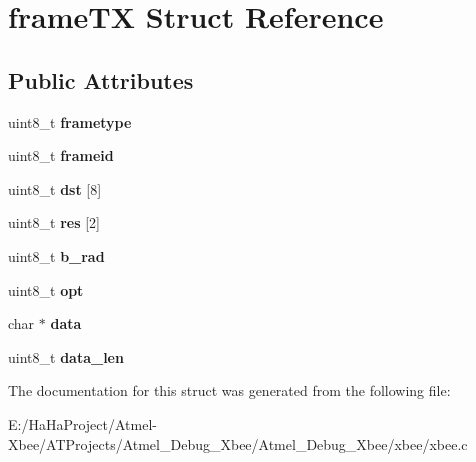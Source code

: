 \hypertarget{structframe_t_x}{}\section{frame\+TX Struct Reference}
\label{structframe_t_x}
\subsection*{Public Attributes}
\begin{DoxyCompactItemize}
\item 
\mbox{\label{structframe_t_x_ae0184264e132f9acfedd9d73e067d749}} 
uint8\+\_\+t {\bfseries frametype}
\item 
\mbox{\label{structframe_t_x_a81728989f69fb448c3107efe57d9acee}} 
uint8\+\_\+t {\bfseries frameid}
\item 
\mbox{\label{structframe_t_x_ac6af0f89587bfdd91eabbc1664ed0b18}} 
uint8\+\_\+t {\bfseries dst} \mbox{[}8\mbox{]}
\item 
\mbox{\label{structframe_t_x_aaa8e3f6c37ba7164586ece2aa05d02d1}} 
uint8\+\_\+t {\bfseries res} \mbox{[}2\mbox{]}
\item 
\mbox{\label{structframe_t_x_a9902ea07b8e5fc897038c4a78c052d46}} 
uint8\+\_\+t {\bfseries b\+\_\+rad}
\item 
\mbox{\label{structframe_t_x_a683e80dc13eeb1ab084dcc79deea00a1}} 
uint8\+\_\+t {\bfseries opt}
\item 
\mbox{\label{structframe_t_x_a03427b6b3acbd35f51927438a3366cb5}} 
char $\ast$ {\bfseries data}
\item 
\mbox{\label{structframe_t_x_ae0f22f3d183e38466e30f42b9b69534e}} 
uint8\+\_\+t {\bfseries data\+\_\+len}
\end{DoxyCompactItemize}


The documentation for this struct was generated from the following file\+:\begin{DoxyCompactItemize}
\item 
E\+:/\+Ha\+Ha\+Project/\+Atmel-\/\+Xbee/\+A\+T\+Projects/\+Atmel\+\_\+\+Debug\+\_\+\+Xbee/\+Atmel\+\_\+\+Debug\+\_\+\+Xbee/xbee/xbee.\+c\end{DoxyCompactItemize}
